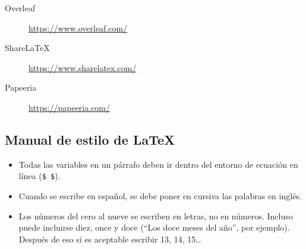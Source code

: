 \documentclass[12pt,letterpaper]{article}
\begin{document}
\begin{description}
\item[Overleaf] \url{https://www.overleaf.com/}
\item[ShareLaTeX] \url{https://www.sharelatex.com/}
\item[Papeeria] \url{https://papeeria.com/}
\end{description}

\subsection{Manual de estilo de \LaTeX}

\begin{itemize}
\item Todas las variables en un párrafo deben ir dentro del entorno de ecuación en línea (\verb+$ $+).
\item Cuando se escribe en español, se debe poner en cursiva las palabras en inglés.
\item Los números del cero al nueve se escriben en letras, no en números. Incluso puede incluirse diez, once y doce (``Los doce meses del año'', por ejemplo). Después de eso sí es aceptable escribir 13, 14, 15\ldots 
\end{itemize}








\end{document}
